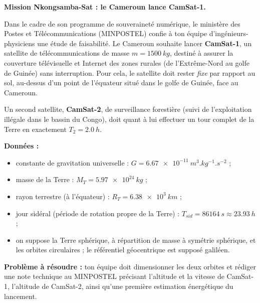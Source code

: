 \documentclass[11pt]{article}
\newcounter{popsec}
\newcounter{popsub}
\newcommand{\courssub}[1]{%
  \stepcounter{popsub}%
  \par\vspace{9pt}\noindent{\popxbold\fontsize{11.5}{13}\selectfont\color{popink}{\color{poporange}\thepopsec.\thepopsub}\hspace{6pt}#1}\par\nopagebreak\vspace{4pt}
}
\begin{document}
\courssub{Situation}

\textbf{Mission Nkongsamba-Sat : le Cameroun lance CamSat-1.}

Dans le cadre de son programme de souveraineté numérique, le ministère des Postes et Télécommunications (MINPOSTEL) confie à ton équipe d'ingénieurs-physiciens une étude de faisabilité. Le Cameroun souhaite lancer \textbf{CamSat-1}, un satellite de télécommunications de masse $m = \SI{1500}{kg}$, destiné à assurer la couverture télévisuelle et Internet des zones rurales (de l'Extrême-Nord au golfe de Guinée) sans interruption. Pour cela, le satellite doit rester \emph{fixe} par rapport au sol, au-dessus d'un point de l'équateur situé dans le golfe de Guinée, face au Cameroun.

Un second satellite, \textbf{CamSat-2}, de surveillance forestière (suivi de l'exploitation illégale dans le bassin du Congo), doit quant à lui effectuer un tour complet de la Terre en exactement $T_2 = \SI{2,0}{h}$.

\textbf{Données :}
\begin{itemize}
\item constante de gravitation universelle : $G = \SI{6,67e-11}{m^3.kg^{-1}.s^{-2}}$ ;
\item masse de la Terre : $M_T = \SI{5,97e24}{kg}$ ;
\item rayon terrestre (à l'équateur) : $R_T = \SI{6,38e3}{km}$ ;
\item jour sidéral (période de rotation propre de la Terre) : $T_{sid} = \SI{86164}{s} \approx \SI{23,93}{h}$ ;
\item on suppose la Terre sphérique, à répartition de masse à symétrie sphérique, et les orbites circulaires ; le référentiel géocentrique est supposé galiléen.
\end{itemize}

\textbf{Problème à résoudre :} ton équipe doit dimensionner les deux orbites et rédiger une note technique au MINPOSTEL précisant l'altitude et la vitesse de CamSat-1, l'altitude de CamSat-2, ainsi qu'une première estimation énergétique du lancement.
\end{document}
